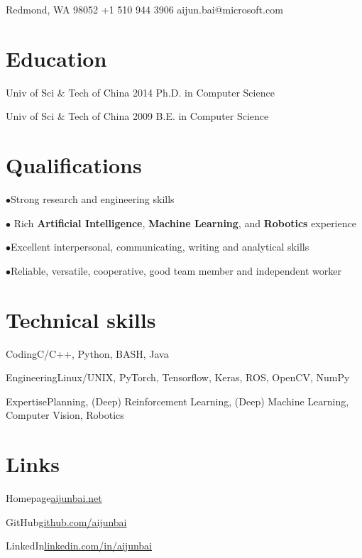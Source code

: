 \documentclass[fontsize=10pt]{tccv}
\begin{document}
\personal
{Redmond, WA 98052}
{+1 510 944 3906}
{aijun.bai@microsoft.com}

\section{Education}

\begin{yearlist}

	\item[Univ of Sci \& Tech of China]{2014}
        {Ph.D. in Computer Science}{}

	\item[Univ of Sci \& Tech of China]{2009}
        {B.E. in Computer Science}{}

\end{yearlist}

\section{Qualifications}

\begin{factlist}
	\item{$\bullet$}{Strong research and engineering skills}
	\item{$\bullet$}{ Rich \textbf{Artificial Intelligence}, \textbf{Machine Learning}, and \textbf{Robotics} experience}
	\item{$\bullet$}{Excellent interpersonal, communicating, writing and analytical skills}
	\item{$\bullet$}{Reliable, versatile, cooperative, good team member and independent worker}
\end{factlist}

\section{Technical skills}

\begin{factlist}
	\item{Coding}{C/C++, Python, BASH, Java}
	\item{Engineering}{Linux/UNIX, PyTorch, Tensorflow, Keras, ROS, OpenCV, NumPy}
	\item{Expertise}{Planning, (Deep) Reinforcement Learning, (Deep) Machine Learning, Computer Vision, Robotics}
\end{factlist}

\section{Links}

\begin{factlist}
	\item{Homepage}{\href{http://aijunbai.github.io/}{aijunbai.net}}
	\item{GitHub}{\href{https://github.com/aijunbai}{github.com/aijunbai}}
	\item{LinkedIn}{\href{https://www.linkedin.com/in/aijunbai}{linkedin.com/in/aijunbai}}
\end{factlist}
\end{document}
